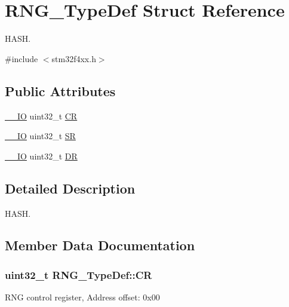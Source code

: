 \hypertarget{struct_r_n_g___type_def}{}\section{R\+N\+G\+\_\+\+Type\+Def Struct Reference}
\label{struct_r_n_g___type_def}


H\+A\+SH.  




{\ttfamily \#include $<$stm32f4xx.\+h$>$}

\subsection*{Public Attributes}
\begin{DoxyCompactItemize}
\item 
\hyperlink{core__cm4_8h_aec43007d9998a0a0e01faede4133d6be}{\+\_\+\+\_\+\+IO} uint32\+\_\+t \hyperlink{struct_r_n_g___type_def_ab422a7aeea33d29d0f8b841bb461e3a8}{CR}
\item 
\hyperlink{core__cm4_8h_aec43007d9998a0a0e01faede4133d6be}{\+\_\+\+\_\+\+IO} uint32\+\_\+t \hyperlink{struct_r_n_g___type_def_a4e4c38cd6a078fea5f9fa5e31bc0d326}{SR}
\item 
\hyperlink{core__cm4_8h_aec43007d9998a0a0e01faede4133d6be}{\+\_\+\+\_\+\+IO} uint32\+\_\+t \hyperlink{struct_r_n_g___type_def_a89f3352fb11cca430aaecc0c9b49c6d3}{DR}
\end{DoxyCompactItemize}


\subsection{Detailed Description}
H\+A\+SH. 

\subsection{Member Data Documentation}
\subsubsection[{\texorpdfstring{CR}{CR}}]{ uint32\+\_\+t R\+N\+G\+\_\+\+Type\+Def\+::\+CR}\hypertarget{struct_r_n_g___type_def_ab422a7aeea33d29d0f8b841bb461e3a8}{}\label{struct_r_n_g___type_def_ab422a7aeea33d29d0f8b841bb461e3a8}
R\+NG control register, Address offset\+: 0x00 
